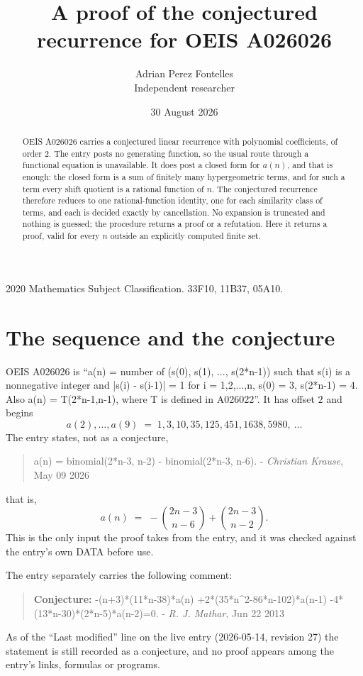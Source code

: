 \documentclass[11pt,a4paper]{article}
\title{A proof of the conjectured recurrence for OEIS A026026}
\author{Adrian Perez Fontelles\\ \small Independent researcher}
\date{30 August 2026}
\theoremstyle{plain}
\theoremstyle{definition}
\begin{document}
\maketitle

\begin{abstract}
OEIS A026026 carries a conjectured linear recurrence with polynomial coefficients, of
order 2. The entry posts no generating function, so the usual route through a
functional equation is unavailable. It does post a closed form for $a(n)$, and that is
enough: the closed form is a sum of finitely many hypergeometric terms, and for such a
term every shift quotient is a rational function of $n$. The conjectured recurrence
therefore reduces to one rational-function identity, one for each similarity
class of terms, and each is decided exactly by cancellation. No expansion is truncated and
nothing is guessed; the procedure returns a proof or a refutation. Here it returns a proof,
valid for every $n$ outside an explicitly computed finite set.
\end{abstract}

\noindent\small 2020 Mathematics Subject Classification. 33F10, 11B37, 05A10.\normalsize

\section{The sequence and the conjecture}

OEIS A026026 is ``a(n) = number of (s(0), s(1), ..., s(2*n-1)) such that s(i) is a nonnegative integer and |s(i) - s(i-1)| = 1 for i = 1,2,...,n, s(0) = 3, s(2*n-1) = 4. Also a(n) = T(2*n-1,n-1), where T is defined in A026022''. It has offset $2$ and begins
\[
a(2),\dots,a(9)\;=\;1, 3, 10, 35, 125, 451, 1638, 5980,\ \dots
\]
The entry states, not as a conjecture,
\begin{quote}\small
a(n) = binomial(2*n-3, n-2) - binomial(2*n-3, n-6). - \emph{Christian Krause}, May 09 2026
\end{quote}
that is,
\begin{equation}\label{eq:cf}
a(n)\;=\;- {\binom{2 n - 3}{n - 6}} + {\binom{2 n - 3}{n - 2}} .
\end{equation}
This is the only input the proof takes from the entry, and it was checked against the
entry's own DATA before use.

The entry separately carries the following comment:
\begin{quote}\small
\textbf{Conjecture:} -(n+3)*(11*n-38)*a(n) +2*(35*n\^{}2-86*n-102)*a(n-1) -4*(13*n-30)*(2*n-5)*a(n-2)=0. - \emph{R. J. Mathar}, Jun 22 2013
\end{quote}
As of the ``Last modified'' line on the live entry (2026-05-14, revision 27) the
statement is still recorded as a conjecture, and no proof appears among the entry's links,
formulas or programs.
\end{document}
